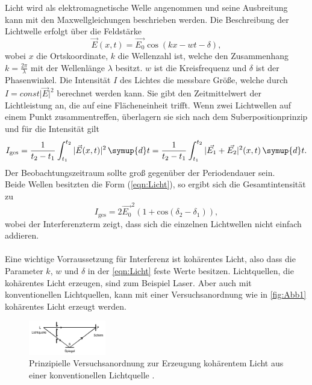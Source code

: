 Licht wird als elektromagnetische Welle angenommen und seine Ausbreitung kann mit den Maxwellgleichungen beschrieben werden.
Die Beschreibung der Lichtwelle erfolgt über die Feldstärke
\begin{equation}
    \vec{E}(x,t) = \vec{E_0} \cos(kx-wt-\delta),
    \label{eqn:Licht}
\end{equation}
wobei $x$ die Ortskoordinate, $k$ die Wellenzahl ist, welche den Zusammenhang $k = \frac{2\pi}{\lambda}$ mit der Wellenlänge $\lambda$ besitzt. 
$w$ ist die Kreisfrequenz und $\delta$ ist der Phasenwinkel.
Die Intensität $I$ des Lichtes die messbare Größe, welche durch $I = const \lvert \vec{E} \rvert^2$ berechnet werden kann.
Sie gibt den Zeitmittelwert der Lichtleistung an, die auf eine Flächeneinheit trifft. 
Wenn zwei Lichtwellen auf einem Punkt zusammentreffen, überlagern sie sich nach dem Suberpositionprinzip und für die Intensität gilt
\begin{equation*}
    I_{\text{ges}} = \frac{1}{t_2 - t_1} \int_{t_1}^{t_2} | \vec{E}(x,t)|^2 \, \symup{d}t  = \frac{1}{t_2 - t_1} \int_{t_1}^{t_2} | \vec{E_1}+ \vec{E_2}|^2 (x,t) \, \symup{d}t .
\end{equation*}
Der Beobachtungszeitraum sollte groß gegenüber der Periodendauer sein.\\
Beide Wellen besitzten die Form (\ref{eqn:Licht}), so ergibt sich die Gesamtintensität zu 
\begin{equation*}
    I_{\text{ges}} = 2\vec{E_0}^2(1+\text{cos}(\delta_2 - \delta_1)), 
\end{equation*}
wobei der Interferenzterm zeigt, dass sich die einzelnen Lichtwellen nicht einfach addieren.\\
\\
Eine wichtige Vorraussetzung für Interferenz ist kohärentes Licht, also dass die Parameter $k$, $w$ und $\delta$ in der 
\autoref{eqn:Licht} feste Werte besitzen.
Lichtquellen, die kohärentes Licht erzeugen, sind zum Beispiel Laser. 
Aber auch mit konventionellen Lichtquellen, kann mit einer Versuchsanordnung wie in \autoref{fig:Abb1} kohärentes Licht erzeugt werden.
\begin{figure}[H]
    \centering
    \includegraphics[width=0.3\textwidth]{build/Abb1.PNG}
    \caption {Prinzipielle Versuchsanordnung zur Erzeugung kohärentem Licht aus einer konventionellen Lichtquelle \cite[3]{V401}.}
    \label{fig:Abb1}
\end{figure}
